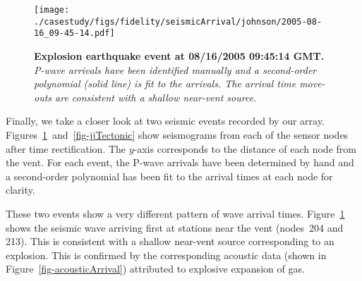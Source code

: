 %

\begin{figure}[t]
\begin{center}
\texttt{[image: ./casestudy/figs/fidelity/seismicArrival/johnson/2005-08-16\_09-45-14.pdf]}
\end{center}
\caption{\small{\bf Explosion earthquake event at 08/16/2005 09:45:14 GMT.}
{\em P-wave arrivals have been identified manually and a second-order
polynomial (solid line) is fit to the arrivals. The arrival time
move-outs are consistent with a shallow near-vent source.}}
\label{fig-jjExplosion}
\end{figure}


Finally, we take a closer look at two seismic events recorded by our
array.  Figures~\ref{fig-jjExplosion}~and~\ref{fig-jjTectonic} show
seismograms from each of the sensor nodes after time rectification.
The $y$-axis corresponds to the distance of each node from the vent.
For each event, the P-wave arrivals have been determined by hand and a
second-order polynomial has been fit to the arrival times at each node
for clarity.

These two events show a very different pattern of wave arrival
times. Figure~\ref{fig-jjExplosion} shows the seismic wave
arriving first at stations near the vent (nodes~204 and 213). This
is consistent with a shallow near-vent source corresponding to an
explosion. This is confirmed by the corresponding acoustic data (shown
in Figure~\ref{fig-acousticArrival}) attributed to explosive expansion
of gas. 

